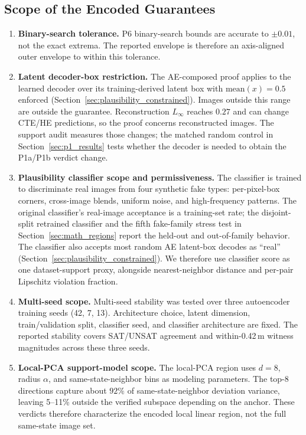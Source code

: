 \documentclass[twocolumn,smallextended,runningheads]{svjour3}
\begin{document}
\subsection{Scope of the Encoded Guarantees}

\begin{enumerate}[nosep]
  \item \textbf{Binary-search tolerance.} P6 binary-search bounds are accurate to $\pm 0.01$, not the exact extrema. The reported envelope is therefore an axis-aligned outer envelope to within this tolerance.
  \item \textbf{Latent decoder-box restriction.} The AE-composed proof applies to the learned decoder over its training-derived latent box with $\text{mean}(x)=0.5$ enforced (Section~\ref{sec:plausibility_constrained}). Images outside this range are outside the guarantee. Reconstruction $L_\infty$ reaches $0.27$ and can change CTE/HE predictions, so the proof concerns reconstructed images. The support audit measures those changes; the matched random control in Section~\ref{sec:p1_results} tests whether the decoder is needed to obtain the P1a/P1b verdict change.
  \item \textbf{Plausibility classifier scope and permissiveness.} The classifier is trained to discriminate real images from four synthetic fake types: per-pixel-box corners, cross-image blends, uniform noise, and high-frequency patterns. The original classifier's real-image acceptance is a training-set rate; the disjoint-split retrained classifier and the fifth fake-family stress test in Section~\ref{sec:math_regions} report the held-out and out-of-family behavior. The classifier also accepts most random AE latent-box decodes as ``real'' (Section~\ref{sec:plausibility_constrained}). We therefore use classifier score as one dataset-support proxy, alongside nearest-neighbor distance and per-pair Lipschitz violation fraction.
  \item \textbf{Multi-seed scope.} Multi-seed stability was tested over three autoencoder training seeds (42, 7, 13). Architecture choice, latent dimension, train/validation split, classifier seed, and classifier architecture are fixed. The reported stability covers SAT/UNSAT agreement and within-0.42\,m witness magnitudes across these three seeds.
  \item \textbf{Local-PCA support-model scope.} The local-PCA region uses $d=8$, radius $\alpha$, and same-state-neighbor bins as modeling parameters. The top-8 directions capture about $92\%$ of same-state-neighbor deviation variance, leaving 5--11\% outside the verified subspace depending on the anchor. These verdicts therefore characterize the encoded local linear region, not the full same-state image set.

\end{enumerate}
\end{document}
